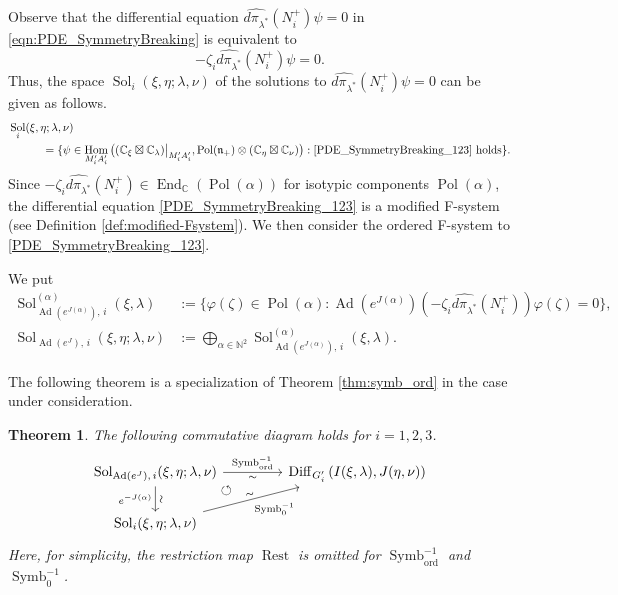 \documentclass[a4paper,11pt,reqno]{amsart}
\newcommand{\frakn}{\mathfrak{n}}
\newcommand{\CC}{\mathbb{C}}
\newcommand{\NN}{\mathbb{N}}
\newcommand{\0}{{\bf 0}}
\newcommand{\C}{\mathbb{C}}
\newcommand{\1}{{\bf 1}}
\DeclareMathOperator{\Ad}{Ad}
\DeclareMathOperator{\End}{End}
\DeclareMathOperator{\Hom}{Hom}
\DeclareMathOperator{\Pol}{Pol}
\newcommand{\ord}{{\mathrm{ord}}}
\DeclareMathOperator{\Diff}{Diff}
\DeclareMathOperator{\Sol}{Sol}
\DeclareMathOperator{\Symb}{Symb}
\DeclareMathOperator{\Rest}{Rest}
\theoremstyle{plain}
\newtheorem{theorem}[equation]{Theorem}
\theoremstyle{definition}
\numberwithin{equation}{section}
\theoremstyle{definition}
\begin{document}
Observe that the differential equation
$\widehat{d\pi_{\lambda^*}}(N_i^+)\psi = 0$ in 
\eqref{eqn:PDE_SymmetryBreaking}
is equivalent to
\begin{equation}\label{PDE_SymmetryBreaking_123}
-\zeta_i\widehat{d\pi_{\lambda^*}}(N_i^+)\psi = 0.
\end{equation}
Thus, the space $\Sol_i(\xi,\eta; \lambda,\nu)$ of the solutions to 
$\widehat{d\pi_{\lambda^*}}(N_i^+)\psi = 0$ can be given as follows.
\begin{align}
&\Sol_i(\xi,\eta; \lambda,\nu) \nonumber\\
&\hspace{30pt}= \{ \psi \in 
\Hom_{M_i'A_i'}\big((\CC_\xi\boxtimes \CC_{\lambda})\big\rvert_{M_i'A_i'},\Pol(\frakn_+)\otimes (\CC_\eta\boxtimes \CC_{\nu})\big) : 
\text{\eqref{PDE_SymmetryBreaking_123} holds}\}.
\end{align}
Since $-\zeta_i\widehat{d\pi_{\lambda^*}}(N_i^+) \in \End_\C(\Pol(\alpha))$
for isotypic components $\Pol(\alpha)$, the differential equation \eqref{PDE_SymmetryBreaking_123} is a modified F-system (see Definition \ref{def:modified-Fsystem}).
We then consider the ordered F-system to \eqref{PDE_SymmetryBreaking_123}.

We put
\begin{align}
\Sol_{\Ad(e^{J(\alpha)}),\, i}^{(\alpha)}(\xi,\lambda)
&:=\{\varphi(\zeta) \in \Pol(\alpha) : 
\Ad(e^{J(\alpha)})(-\zeta_i\widehat{d\pi_{\lambda^*}}(N_i^+))\varphi(\zeta)=0\},
\label{eqn:SolalphaAd}\\
\Sol_{\Ad(e^{J}),\, i}(\xi,\eta; \lambda,\nu) 
&:= \bigoplus_{\alpha \in \NN^2}\Sol_{\Ad(e^{J(\alpha)}),\, i}^{(\alpha)}(\xi,\lambda).
\end{align}

The following theorem is a specialization of Theorem \ref{thm:symb_ord} 
in the case under consideration.

\begin{theorem}
The following commutative diagram holds for $i=1,2,3$.
\begin{equation}\label{eqn:conji}
\begin{tikzcd}[column sep=1.5cm]
	{\Sol_{\Ad(e^{J}),\, i}(\xi,\eta; \lambda,\nu)}  	
	&{\Diff_{G_i^\prime}\left(I(\xi, \lambda), J(\eta, \nu)\right)} \\
	 {\Sol_i(\xi,\eta; \lambda,\nu)} &
	\arrow[ul, pos=0.886, phantom, "\circlearrowleft"]
	\arrow["\Symb_{\ord}^{-1}", "\sim"' sloped,  from=1-1, to=1-2]
	\arrow["\sim" sloped, "\Symb_0^{-1}"', from=2-1, to=1-2]
	\arrow["\sim" sloped, "e^{-J(\alpha)}"',  from=1-1, to=2-1]
\end{tikzcd}
\end{equation}
Here, for simplicity, the restriction map $\Rest$ is omitted 
for $\Symb_{\ord}^{-1}$ and $\Symb_0^{-1}$.
\end{theorem}
\end{document}
